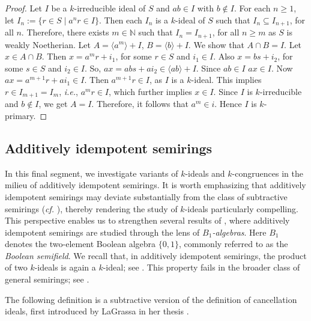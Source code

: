 \documentclass[11pt,english]{amsart}
\theoremstyle{definition}
\numberwithin{equation}{section}
\begin{document}
\begin{proof}
    Let $I$ be a $k$-irreducible ideal of $S$ and $ab\in I$ with $b\notin I$. For each $n\geqslant 1$, let $I_n:=\{r\in S \mid a^nr\in I\}$. Then each $I_n$ is a $k$-ideal of $S$ such that $I_n\subseteq I_{n+1}$, for all $n$. Therefore, there exists $m\in \mathds{N}$ such that $I_n=I_{n+1}$, for all $n\geqslant m$ as $S$ is weakly Noetherian. Let $A=\langle a^m\rangle+I$, $B=\langle b \rangle+I$. We show that $A\cap B=I$. Let $x\in A\cap B$. Then $x=a^mr+i_1$, for some $r\in S$ and $i_1\in I$. Also $x=bs+i_2$, for some $s\in S$ and $i_2\in I$. So, $ax=abs+ai_2\in \langle ab \rangle+I$. Since $ab\in I$ $ax\in I$. Now $ax=a^{m+1}r+ai_1\in I$. Then $a^{m+1}r\in I$, as $I$ is a $k$-ideal. This implies $r\in I_{m+1}=I_m$, \textit{i.e.}, $a^mr\in I$, which further implies $x\in I$. Since $I$ is $k$-irreducible and $b\notin I$, we get $A=I$. Therefore, it follows that $a^m\in i$. Hence $I$ is $k$-primary.
\end{proof}

\smallskip
\subsection{Additively idempotent semirings}\label{Subsection: additively idempotent}


In this final segment, we investigate variants of $k$-ideals and $k$-congruences in the milieu of additively idempotent semirings. It is worth emphasizing that additively idempotent semirings may deviate substantially from the class of subtractive semirings (\textit{cf.} \cite[Example 6.39]{Golan}), thereby rendering the study of $k$-ideals particularly compelling.
This perspective enables us to strengthen several results of \cite{Lescot11, Lescot15}, where additively idempotent semirings are studied through the lens of \emph{$B_1$-algebras}. Here $B_1$ denotes the two-element Boolean algebra $\{0,1\}$, commonly referred to as the \emph{Boolean semifield}. We recall that, in additively idempotent semirings, the product of two $k$-ideals is again a $k$-ideal; see \cite[Lemma 3.27]{JunRayTolliver22}. This property fails in the broader class of general semirings; see \cite[Example 6.43]{Golan}.

The following definition is a subtractive version of the definition of cancellation ideals, first introduced by LaGrassa in her thesis \cite{LaGrassa95}.
\end{document}
